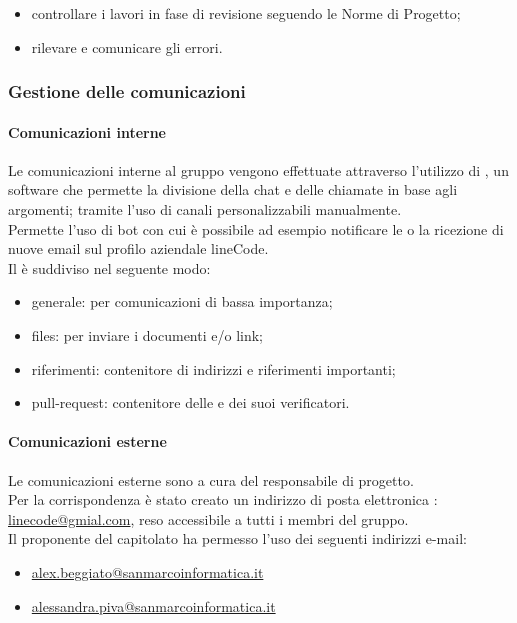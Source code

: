 		\begin{itemize}
			\item controllare i lavori in fase di revisione seguendo le Norme di Progetto;
			\item rilevare e comunicare gli errori.
		\end{itemize}
		
		 \subsubsection{Gestione delle comunicazioni}
		 
		 \paragraph{Comunicazioni interne}
		 Le comunicazioni interne al gruppo vengono effettuate attraverso l'utilizzo di , un software che permette la divisione della chat e delle chiamate in base agli argomenti; tramite l'uso di canali personalizzabili manualmente. \\ Permette l'uso di bot con cui è possibile ad esempio notificare le  o la ricezione di nuove email sul profilo aziendale lineCode. \\
		 Il   è suddiviso nel seguente modo:
		 	\begin{itemize}
		 	\item {\ttfamily generale}: per comunicazioni di bassa importanza;
		 	\item {\ttfamily files}: per inviare i documenti e/o link;
		 	\item {\ttfamily riferimenti}: contenitore di indirizzi e riferimenti importanti;
		 	\item {\ttfamily pull-request}: contenitore delle  e dei suoi verificatori.
		 	\end{itemize}
	 
		 \paragraph{Comunicazioni esterne}
		 Le comunicazioni esterne sono a cura del responsabile di progetto. \\
		 Per la corrispondenza è stato creato un indirizzo di posta elettronica : \url{linecode@gmial.com}, reso accessibile a tutti i membri del gruppo.\\
		 Il proponente del capitolato ha  permesso l'uso dei seguenti indirizzi e-mail:
		 \begin{itemize}
		 	\item \url{alex.beggiato@sanmarcoinformatica.it}
		 	\item \url{alessandra.piva@sanmarcoinformatica.it}
		 \end{itemize}
		 

